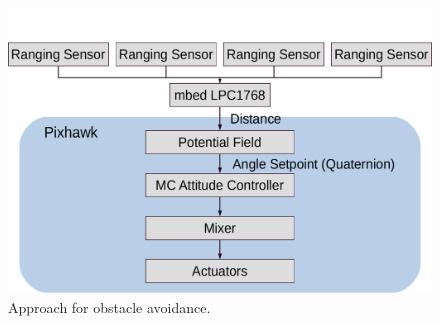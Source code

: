 \begin{figure}
	\centering
	\includegraphics[width=0.8\linewidth]{pictures/approach.pdf}
	\caption{Approach for obstacle avoidance.}
	\label{fig:approach}
\end{figure}

